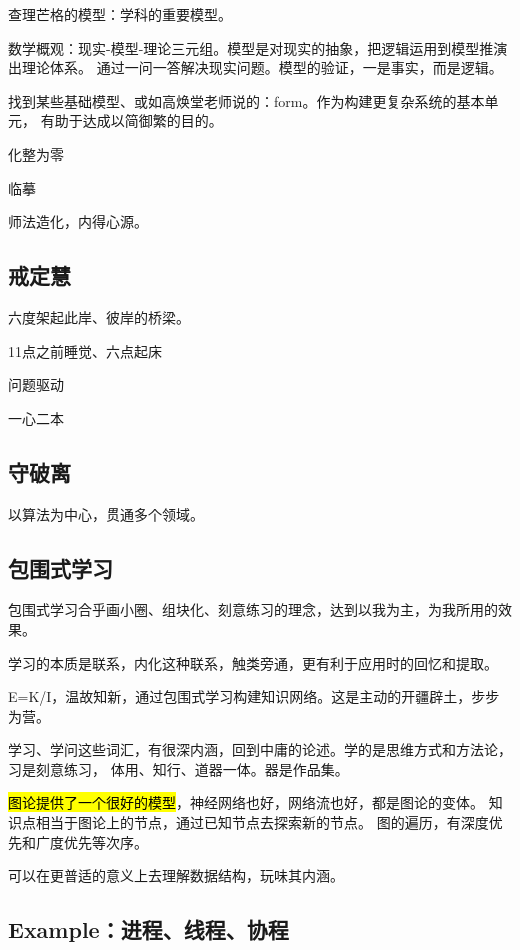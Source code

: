 查理芒格的模型：学科的重要模型。

数学概观：现实-模型-理论三元组。模型是对现实的抽象，把逻辑运用到模型推演出理论体系。
通过一问一答解决现实问题。模型的验证，一是事实，而是逻辑。

找到某些基础模型、或如高焕堂老师说的：form。作为构建更复杂系统的基本单元，
有助于达成以简御繁的目的。

化整为零

临摹

师法造化，内得心源。

\subsection{戒定慧}

六度架起此岸、彼岸的桥梁。

\begin{enumbox}
\item 11点之前睡觉、六点起床
\item 问题驱动
\item 一心二本
\end{enumbox}

\subsection{守破离}

以算法为中心，贯通多个领域。

\subsection{包围式学习}

包围式学习合乎画小圈、组块化、刻意练习的理念，达到以我为主，为我所用的效果。

学习的本质是联系，内化这种联系，触类旁通，更有利于应用时的回忆和提取。

E=K/I，温故知新，通过包围式学习构建知识网络。这是主动的开疆辟土，步步为营。

学习、学问这些词汇，有很深内涵，回到中庸的论述。学的是思维方式和方法论，习是刻意练习，
体用、知行、道器一体。器是作品集。

\hl{图论提供了一个很好的模型}，神经网络也好，网络流也好，都是图论的变体。
知识点相当于图论上的节点，通过已知节点去探索新的节点。
图的遍历，有深度优先和广度优先等次序。

可以在更普适的意义上去理解数据结构，玩味其内涵。

\subsection{Example：进程、线程、协程}

